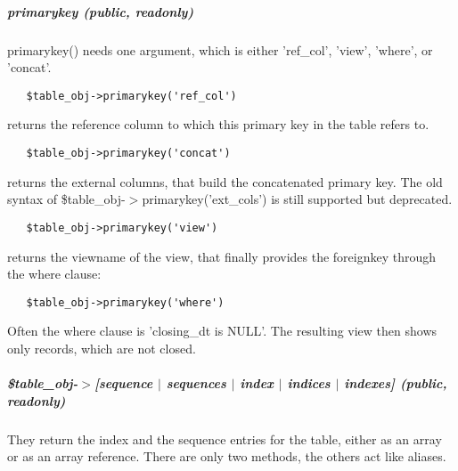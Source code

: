 \subparagraph*{primarykey (public, readonly)\label{Apiis::Model::TableObj_--_internal_package_to_provide_a_table_object_with_methods_to_access_a_single_table_and_its_columns_primarykey_public_readonly_}}


primarykey() needs one argument, which is either 'ref\_col', 'view',
'where', or 'concat'.

\begin{verbatim}
   $table_obj->primarykey('ref_col')
\end{verbatim}


returns the reference column to which this primary key in the table refers
to.

\begin{verbatim}
   $table_obj->primarykey('concat')
\end{verbatim}


returns the external columns, that build the concatenated primary key. The
old syntax of \$table\_obj-$>$primarykey('ext\_cols') is still supported but
deprecated.

\begin{verbatim}
   $table_obj->primarykey('view')
\end{verbatim}


returns the viewname of the view, that finally provides the foreignkey
through the where clause:

\begin{verbatim}
   $table_obj->primarykey('where')
\end{verbatim}


Often the where clause is 'closing\_dt is NULL'. The resulting view then
shows only records, which are not closed.

\subparagraph*{\$table\_obj-$>$[sequence $|$ sequences $|$ index $|$ indices $|$ indexes] (public,
readonly)\label{Apiis::Model::TableObj_--_internal_package_to_provide_a_table_object_with_methods_to_access_a_single_table_and_its_columns__table_obj-_sequence_sequences_index_indices_indexes_public_readonly_}}


They return the index and the sequence entries for the table,
either as an array or as an array reference. There are only two
methods, the others act like aliases.




